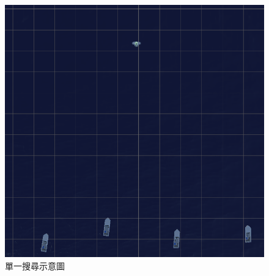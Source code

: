 \documentclass[12pt,a4paper]{article}
\begin{document}
\begin{itemize}
\begin{figure}[h]
\begin{minipage}[t]{0.4\textwidth}
	        \includegraphics[width=\textwidth]{image/SingleDemo.png}
	        \caption{單一搜尋示意圖}
	    \end{minipage}
	\end{figure}

\end{itemize}

\newpage
\end{document}
